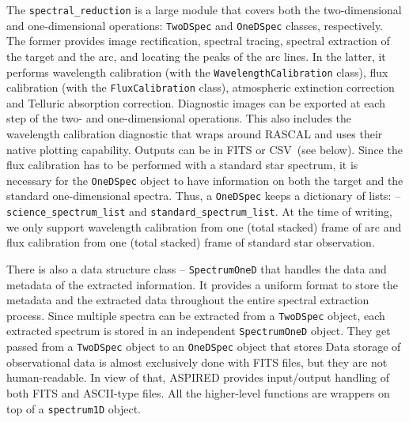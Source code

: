 \documentclass[twocolumn, linenumbers]{aastex631}
\begin{document}
The \texttt{spectral\_reduction} is a large module that covers both the
two-dimensional and one-dimensional operations: \texttt{TwoDSpec} and
\texttt{OneDSpec} classes, respectively. The former provides image
rectification, spectral tracing, spectral extraction of the target and the
arc, and locating the peaks of the arc lines. In the latter, it performs
wavelength calibration (with the \texttt{WavelengthCalibration} class),
flux calibration (with the \texttt{FluxCalibration} class), atmospheric
extinction correction and Telluric absorption correction. Diagnostic images
can be exported at each step of the two- and one-dimensional operations.
This also includes the wavelength calibration diagnostic that wraps around
\textsc{RASCAL} and uses their native plotting capability. Outputs can be
in FITS or CSV~(see below). Since the flux calibration has to be performed
with a standard star spectrum, it is necessary for the \texttt{OneDSpec}
object to have information on both the target and the standard one-dimensional
spectra. Thus, a \texttt{OneDSpec} keeps a dictionary of lists: --
\texttt{science\_spectrum\_list} and \texttt{standard\_spectrum\_list}. At the
time of writing, we only support wavelength calibration from one (total
stacked) frame of arc and flux calibration from one (total stacked) frame
of standard star observation.

There is also a data structure class -- \texttt{SpectrumOneD} that handles the
data and metadata of the extracted information. It provides a uniform format
to store the metadata and the extracted data throughout the entire spectral
extraction process. Since multiple spectra can be extracted from a
\texttt{TwoDSpec} object, each extracted spectrum is stored in an independent
\texttt{SpectrumOneD} object. They get passed from a \texttt{TwoDSpec} object
to an \texttt{OneDSpec} object that stores Data storage of observational data is
almost exclusively done with FITS files, but they are not human-readable. In
view of that, \textsc{ASPIRED} provides input/output handling of both FITS and
ASCII-type files. All the higher-level functions are wrappers on top of a
\texttt{spectrum1D} object.
\end{document}
